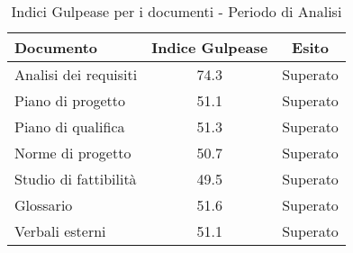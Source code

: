       
      \begin{table}[H]
        \centering
        \begin{tabular}{|l|c|c|}
          \hline
          \textbf{Documento} &\textbf{Indice Gulpease} &\textbf{Esito}\\
          \hline
          Analisi dei requisiti &74.3  &Superato \\
          Piano di progetto &51.1  &Superato \\
          Piano di qualifica  &51.3  &Superato \\
          Norme di progetto &50.7  &Superato \\
          Studio di fattibilità &49.5  &Superato \\
          Glossario &51.6  &Superato  \\
          Verbali esterni &51.1  &Superato \\
          \hline
        \end{tabular}
        \caption{Indici Gulpease per i documenti - Periodo di Analisi}
      \end{table}
